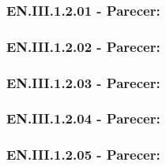 \documentclass[12pt, a4paper]{article}
\begin{document}
    \vspace{1cm} 
    
    \subsubsection*{EN.III.1.2.01 - Parecer:}
    
    \vspace{1cm} 
    
    \subsubsection*{EN.III.1.2.02 - Parecer:}
    
    \vspace{1cm} 
    
    \subsubsection*{EN.III.1.2.03 - Parecer:}
   
    \vspace{1cm} 
    
    \subsubsection*{EN.III.1.2.04 - Parecer:}
    
    
    \vspace{1cm} 
    
    \subsubsection*{EN.III.1.2.05 - Parecer:}
    
    
    
    \newpage
\end{document}

